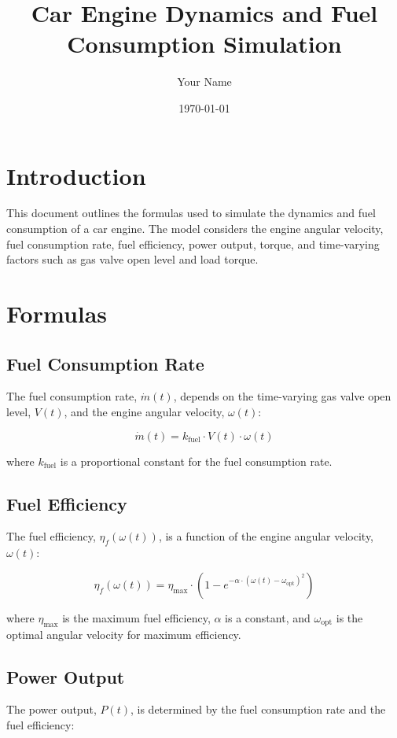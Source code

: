 \documentclass{article}
\title{Car Engine Dynamics and Fuel Consumption Simulation}
\author{Your Name}
\date{\today}
\begin{document}
\maketitle

\section{Introduction}
This document outlines the formulas used to simulate the dynamics and fuel consumption of a car engine. The model considers the engine angular velocity, fuel consumption rate, fuel efficiency, power output, torque, and time-varying factors such as gas valve open level and load torque.

\section{Formulas}

\subsection{Fuel Consumption Rate}
The fuel consumption rate, \(\dot{m}(t)\), depends on the time-varying gas valve open level, \(V(t)\), and the engine angular velocity, \(\omega(t)\):

\begin{equation}
\dot{m}(t) = k_{\text{fuel}} \cdot V(t) \cdot \omega(t)
\end{equation}

where \(k_{\text{fuel}}\) is a proportional constant for the fuel consumption rate.

\subsection{Fuel Efficiency}
The fuel efficiency, \(\eta_f(\omega(t))\), is a function of the engine angular velocity, \(\omega(t)\):

\begin{equation}
\eta_f(\omega(t)) = \eta_{\max} \cdot \left(1 - e^{-\alpha \cdot (\omega(t) - \omega_{\text{opt}})^2}\right)
\end{equation}

where \(\eta_{\max}\) is the maximum fuel efficiency, \(\alpha\) is a constant, and \(\omega_{\text{opt}}\) is the optimal angular velocity for maximum efficiency.

\subsection{Power Output}
The power output, \(P(t)\), is determined by the fuel consumption rate and the fuel efficiency:
\end{document}
